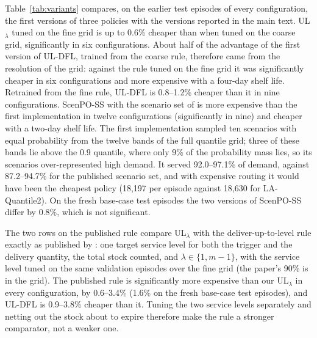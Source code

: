 Table~\ref{tab:variants} compares, on the earlier test episodes of every configuration, the first versions of three policies with the versions reported in the main text. UL$_\lambda$ tuned on the fine grid is up to 0.6\% cheaper than when tuned on the coarse grid, significantly in six configurations. About half of the advantage of the first version of UL-DFL, trained from the coarse rule, therefore came from the resolution of the grid: against the rule tuned on the fine grid it was significantly cheaper in six configurations and more expensive with a four-day shelf life. Retrained from the fine rule, UL-DFL is 0.8--1.2\% cheaper than it in nine configurations. ScenPO-SS with the scenario set of \citet{jia2025scenario} is more expensive than the first implementation in twelve configurations (significantly in nine) and cheaper with a two-day shelf life. The first implementation sampled ten scenarios with equal probability from the twelve bands of the full quantile grid; three of these bands lie above the 0.9 quantile, where only 9\% of the probability mass lies, so its scenarios over-represented high demand. It served 92.0--97.1\% of demand, against 87.2--94.7\% for the published scenario set, and with expensive routing it would have been the cheapest policy (18,197 per episode against 18,630 for LA-Quantile2). On the fresh base-case test episodes the two versions of ScenPO-SS differ by 0.8\%, which is not significant.

The two rows on the published rule compare UL$_\lambda$ with the deliver-up-to-level rule exactly as published by \citet{crama2018stochastic}: one target service level for both the trigger and the delivery quantity, the total stock counted, and $\lambda\in\{1,m-1\}$, with the service level tuned on the same validation episodes over the fine grid (the paper's 90\% is in the grid). The published rule is significantly more expensive than our UL$_\lambda$ in every configuration, by 0.6--3.4\% (1.6\% on the fresh base-case test episodes), and UL-DFL is 0.9--3.8\% cheaper than it. Tuning the two service levels separately and netting out the stock about to expire therefore make the rule a stronger comparator, not a weaker one.

\begin{table}[H]
\centering\footnotesize
\caption{First versus final versions, and the rule as published, on the earlier test episodes: paired cost difference of the first-named policy relative to the second, in percent. Bold: 95\% paired bootstrap interval excludes zero.}\label{tab:variants}
\resizebox{\textwidth}{!}{}
\end{table}
